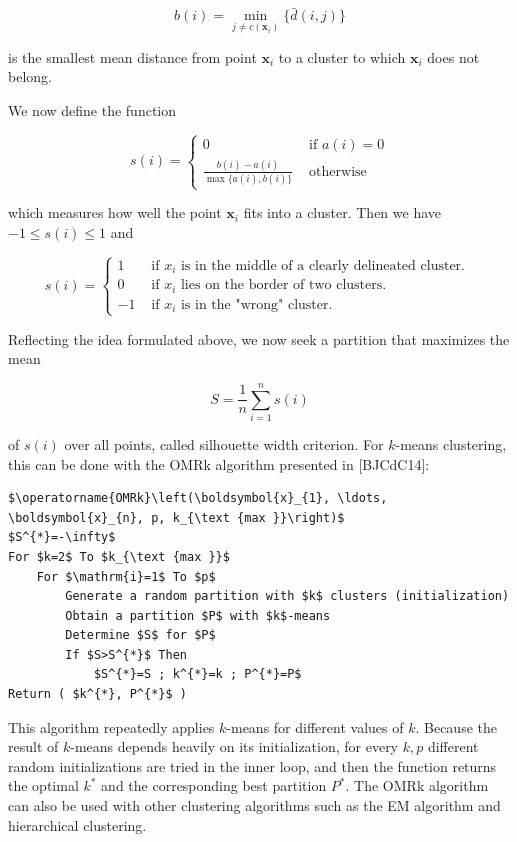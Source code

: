 \documentclass[10pt]{book}
\begin{document}
\begin{center}
\begin{enumerate}
\begin{center}
\begin{center}
\begin{center}
$$
b(i)=\min _{j \neq c\left(\boldsymbol{x}_{i}\right)}\{\bar{d}(i, j)\}
$$

is the smallest mean distance from point $\boldsymbol{x}_{i}$ to a cluster to which $\boldsymbol{x}_{i}$ does not belong.

We now define the function

$$
s(i)=\left\{\begin{array}{cc}
0 & \text { if } a(i)=0 \\
\frac{b(i)-a(i)}{\max \{a(i), b(i)\}} & \text { otherwise }
\end{array}\right.
$$

which measures how well the point $\boldsymbol{x}_{i}$ fits into a cluster. Then we have $-1 \leq s(i) \leq 1$ and

$$
s(i)= \begin{cases}1 & \text { if } x_{i} \text { is in the middle of a clearly delineated cluster. } \\ 0 & \text { if } x_{i} \text { lies on the border of two clusters. } \\ -1 & \text { if } x_{i} \text { is in the "wrong" cluster. }\end{cases}
$$

Reflecting the idea formulated above, we now seek a partition that maximizes the mean

$$
S=\frac{1}{n} \sum_{i=1}^{n} s(i)
$$

of $s(i)$ over all points, called silhouette width criterion. For $k$-means clustering, this can be done with the OMRk algorithm presented in [BJCdC14]:

\begin{verbatim}
$\operatorname{OMRk}\left(\boldsymbol{x}_{1}, \ldots, \boldsymbol{x}_{n}, p, k_{\text {max }}\right)$
$S^{*}=-\infty$
For $k=2$ To $k_{\text {max }}$
    For $\mathrm{i}=1$ To $p$
        Generate a random partition with $k$ clusters (initialization)
        Obtain a partition $P$ with $k$-means
        Determine $S$ for $P$
        If $S>S^{*}$ Then
            $S^{*}=S ; k^{*}=k ; P^{*}=P$
Return ( $k^{*}, P^{*}$ )
\end{verbatim}

This algorithm repeatedly applies $k$-means for different values of $k$. Because the result of $k$-means depends heavily on its initialization, for every $k, p$ different random initializations are tried in the inner loop, and then the function returns the optimal $k^{*}$ and the corresponding best partition $P^{*}$. The OMRk algorithm can also be used with other clustering algorithms such as the EM algorithm and hierarchical clustering.


\end{center}
\end{center}
\end{center}
\end{enumerate}
\end{center}
\end{document}
